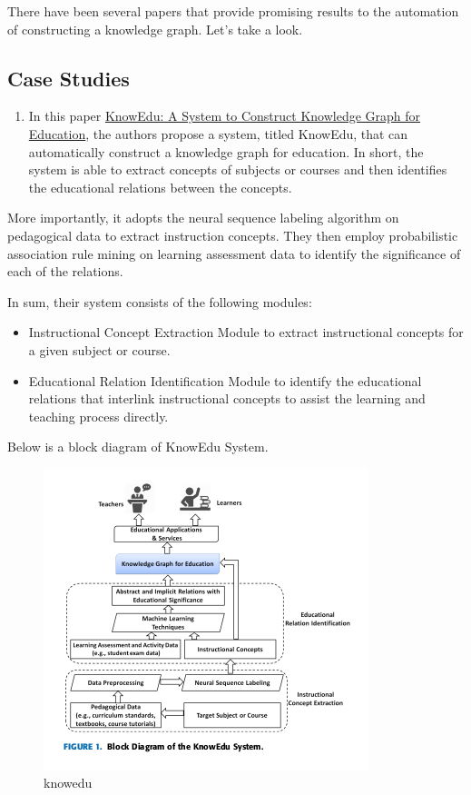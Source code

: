 \documentclass{acm_proc_article-sp}
\providecommand{\tightlist}{%
  \setlength{\itemsep}{0pt}\setlength{\parskip}{0pt}}
\begin{document}
There have been several papers that provide promising results to the
automation of constructing a knowledge graph. Let's take a look.

\subsection{Case Studies}\label{case-studies-4}

\begin{enumerate}
\def\labelenumi{\arabic{enumi}.}
\tightlist
\item
  In this paper
  \href{https://ieeexplore.ieee.org/document/8362657}{KnowEdu: A System
  to Construct Knowledge Graph for Education}, the authors propose a
  system, titled KnowEdu, that can automatically construct a knowledge
  graph for education. In short, the system is able to extract concepts
  of subjects or courses and then identifies the educational relations
  between the concepts.
\end{enumerate}

More importantly, it adopts the neural sequence labeling algorithm on
pedagogical data to extract instruction concepts. They then employ
probabilistic association rule mining on learning assessment data to
identify the significance of each of the relations.

In sum, their system consists of the following modules:

\begin{itemize}
\item
  Instructional Concept Extraction Module to extract instructional
  concepts for a given subject or course.
\item
  Educational Relation Identification Module to identify the educational
  relations that interlink instructional concepts to assist the learning
  and teaching process directly.
\end{itemize}

Below is a block diagram of KnowEdu System.

\begin{figure}
\centering
\includegraphics{img/knowedu.png}
\caption{knowedu}
\end{figure}
\end{document}
